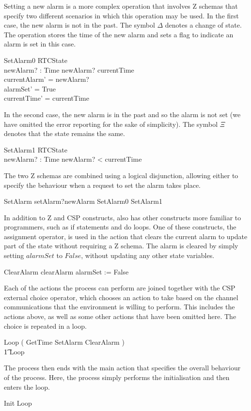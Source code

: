 %
Setting a new alarm is a more complex operation that involves Z
schemas that specify two different scenarios in which this operation
may be used.
In the first case, the new alarm is not in the past.
The symbol $\Delta$ denotes a change of state.
The operation stores the time of the new alarm and sets a flag to
indicate an alarm is set in this case.
%
\begin{schema}{SetAlarm0}
  \Delta RTCState \\
  newAlarm? : Time
\where
  newAlarm? \geq currentTime \\
  currentAlarm' = newAlarm?{} \\
  alarmSet' = True \\
  currentTime' = currentTime
\end{schema}
%
In the second case, the new alarm is in the past and so the alarm is
not set (we have omitted the error reporting for the sake of
simplicity).
The symbol $\Xi$ denotes that the state remains the same.
%
\begin{schema}{SetAlarm1}
  \Xi RTCState \\
  newAlarm? : Time
\where
  newAlarm? < currentTime
\end{schema}
%
The two Z schemas are combined using a logical disjunction, allowing
either to specify the behaviour when a request to set the alarm takes
place.
%
\begin{circusaction}
  SetAlarm \circdef setAlarm?newAlarm \then \lschexpract SetAlarm0 \lor SetAlarm1 \rschexpract
\end{circusaction}
%
In addition to Z and CSP constructs, \Circus{} also has other
constructs more familiar to programmers, such as if statements and do
loops.
One of these constructs, the assignment operator, is used in the
action that clears the current alarm to update part of the state
without requiring a Z schema.
The alarm is cleared by simply setting $alarmSet$ to $False$, without
updating any other state variables.
%
\begin{circusaction}
  ClearAlarm \circdef clearAlarm \then alarmSet := False
\end{circusaction}
%
Each of the actions the process can perform are joined together with
the CSP external choice operator, which chooses an action to take
based on the channel communications that the environment is willing to
perform.
This includes the actions above, as well as some other actions that
have been omitted here.
The choice is repeated in a loop.
%
\begin{circusaction}
  Loop \circdef \left( GetTime \extchoice SetAlarm \extchoice
    ClearAlarm
    \extchoice \cdots \right) \\
  \t1 \circseq Loop
\end{circusaction}
%
The \Circus{} process then ends with the main action that specifies
the overall behaviour of the process.
Here, the process simply performs the initialisation and then enters
the loop.
%
\begin{circusaction}
  \circspot Init \circseq Loop
\end{circusaction}
\begin{circus}
  \circend
\end{circus}

